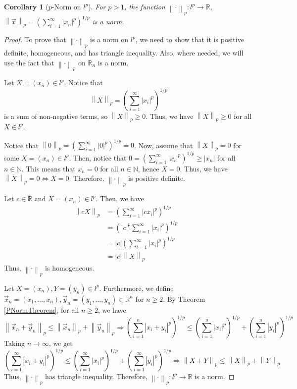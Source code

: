 \documentclass{article}
\newcommand{\longimplies}{\Longrightarrow}
\newcommand{\N}{\mathbb{N}}
\newcommand{\R}{\mathbb{R}}
\newcommand{\norm}[1]{\left\|#1\right\|}
\theoremstyle{plain} %
\numberwithin{thm}{section} %
\newtheorem{cor}[thm]{Corollary}
\theoremstyle{definition} %
\begin{document}
\begin{cor}[$p$-Norm on $l^p$]
     For $p > 1$, the function $\norm{\cdot}_p: l^p \to \R$, $\norm{\vec{x}}_p = \left(\sum_{i = 1}^\infty |x_n|^p\right)^{1/p}$ is a norm.
\end{cor}

\begin{proof}
To prove that $\norm{\cdot}_p$ is a norm on $l^p$, we need to show that it is positive definite, homogeneous, and has triangle inequality. Also, where needed, we will use the fact that $\norm{\cdot}_p$ on $\R_n$ is a norm.

 Let $X = (x_n) \in l^p$. Notice that
\[
    \norm{X}_p = \left(\sum_{i = 1}^\infty |x_i|^p\right)^{1/p}
\]
is a sum of non-negative terms, so $\norm{X}_p \geq 0$. Thus, we have $\norm{X}_p \geq 0$ for all $X \in l^p$.

Notice that $\norm{0}_p = \left(\sum_{i = 1}^\infty |0|^p\right)^{1/p} = 0$. Now, assume that $\norm{X}_p = 0$ for some $X = (x_n) \in l^p$. Then, notice that $0 = \left(\sum_{i = 1}^\infty |x_i|^p\right)^{1/p} \geq |x_n|$ for all $n \in \N$. This means that $x_n = 0$ for all $n \in \N$, hence $X = 0$. Thus, we have $\norm{X}_p = 0 \iff X = 0$. Therefore, $\norm{\cdot}_p$ is positive definite.

 Let $c \in \R$ and $X = (x_n) \in l^p$. Then, we have
\begin{align*}
    \norm{cX}_p
    &= \left(\sum_{i = 1}^\infty |cx_i|^p\right)^{1/p} &\\
    &= \left(|c|^p\sum_{i = 1}^\infty |x_i|^p\right)^{1/p} &\\
    &= |c|\left(\sum_{i = 1}^\infty |x_i|^p\right)^{1/p} &\\
    &= |c|\norm{X}_p
\end{align*}
Thus, $\norm{\cdot}_p$ is homogeneous.

 Let $X = (x_n), Y = (y_n) \in l^p$. Furthermore, we define $\vec{x}_n = (x_1, \dots, x_n), \vec{y}_n = (y_1, \dots, y_n) \in \R^n$ for $n \geq 2$. By Theorem \ref{PNormTheorem}, for all $n \geq 2$, we have
\[
    \norm{\vec{x}_n + \vec{y}_n}_p \leq \norm{\vec{x}_n}_p + \norm{\vec{y}_n}_p \longimplies \left(\sum_{i = 1}^n |x_i + y_i|^p\right)^{1/p} \leq \left(\sum_{i = 1}^n |x_i|^p\right)^{1/p} + \left(\sum_{i = 1}^n |y_i|^p\right)^{1/p}
\]
Taking $n \to \infty$, we get
\[
    \left(\sum_{i = 1}^\infty |x_i + y_i|^p\right)^{1/p} \leq \left(\sum_{i = 1}^\infty |x_i|^p\right)^{1/p} + \left(\sum_{i = 1}^\infty |y_i|^p\right)^{1/p} \longimplies \norm{X + Y}_p \leq \norm{X}_p + \norm{Y}_p
\]
Thus, $\norm{\cdot}_p$ has triangle inequality. Therefore, $\norm{\cdot}_p: l^p \to \R$ is a norm.

\end{proof}
\end{document}
